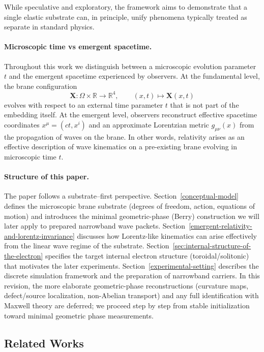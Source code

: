 While speculative and exploratory, the framework aims to demonstrate that a single elastic substrate can, in principle, unify phenomena typically treated as separate in standard physics.

\paragraph{Microscopic time vs emergent spacetime.}
Throughout this work we distinguish between a microscopic evolution parameter $t$ and the emergent spacetime experienced by observers. At the fundamental level, the brane configuration
\[
\mathbf X : \Omega \times \mathbb{R} \to \mathbb{R}^4, \qquad (x,t) \mapsto \mathbf X(x,t)
\]
evolves with respect to an external time parameter $t$ that is not part of the embedding itself. At the emergent level, observers reconstruct effective spacetime coordinates $x^\mu = (ct, x^i)$ and an approximate Lorentzian metric $g_{\mu\nu}(x)$ from the propagation of waves on the brane. In other words, relativity arises as an effective description of wave kinematics on a pre-existing brane evolving in microscopic time $t$.

\paragraph{Structure of this paper.}
The paper follows a substrate--first perspective.
Section~\ref{conceptual-model} defines the microscopic brane substrate (degrees of freedom, action, equations of motion)
and introduces the minimal geometric-phase (Berry) construction we will later apply to prepared narrowband wave packets.
Section~\ref{emergent-relativity-and-lorentz-invariance} discusses how Lorentz-like kinematics can arise effectively from the
linear wave regime of the substrate.
Section~\ref{sec:internal-structure-of-the-electron} specifies the target internal electron structure (toroidal/solitonic)
that motivates the later experiments.
Section~\ref{experimental-setting} describes the discrete simulation framework and the preparation of narrowband carriers.
In this revision, the more elaborate geometric-phase reconstructions (curvature maps, defect/source localization, non-Abelian transport)
and any full identification with Maxwell theory are deferred; we proceed step by step from stable initialization toward
minimal geometric phase measurements.

\subsection{Related Works}\label{related-works}


